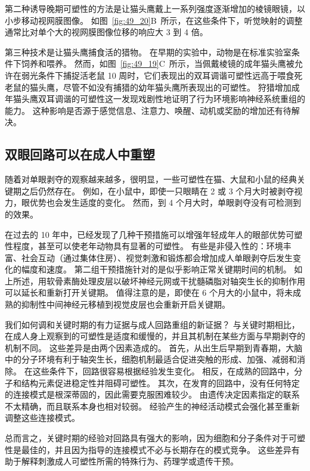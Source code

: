 第二种诱导晚期可塑性的方法是让猫头鹰戴上一系列强度逐渐增加的棱镜眼镜，以小步移动视网膜图像。
如图~\ref{fig:49_20}B~所示，在这些条件下，听觉映射的调整通常比对单个大的视网膜图像位移的响应大 3 到 4 倍。

第三种技术是让猫头鹰捕食活的猎物。
在早期的实验中，动物是在标准实验室条件下饲养和喂养。
然而，如图~\ref{fig:49_19}C~所示，当佩戴棱镜的成年猫头鹰被允许在弱光条件下捕捉活老鼠 10 周时，它们表现出的双耳调谐可塑性远高于喂食死老鼠的猫头鹰，尽管不如没有捕猎的幼年猫头鹰所表现出的可塑性。
狩猎增加成年猫头鹰双耳调谐的可塑性这一发现戏剧性地证明了行为环境影响神经系统重组的能力。
这种影响是否源于感觉信息、注意力、唤醒、动机或奖励的增加还有待解决。



\subsection{双眼回路可以在成人中重塑}

随着对单眼剥夺的观察越来越多，很明显，一些可塑性在猫、大鼠和小鼠的经典关键期之后仍然存在。
例如，在小鼠中，即使一只眼睛在 2 或 3 个月大时被剥夺视力，眼优势也会发生适度的变化。
然而，到 4 个月大时，单眼剥夺没有可检测到的效果。


在过去的 10 年中，已经发现了几种干预措施可以增强年轻成年人的眼部优势可塑性程度，甚至可以使老年动物具有显著的可塑性。
有些是非侵入性的：环境丰富、社会互动（通过集体住房）、视觉刺激和锻炼都会增加成人单眼剥夺后发生变化的幅度和速度。
第二组干预措施针对的是似乎影响正常关键期时间的机制。
如上所述，用软骨素酶处理皮层以破坏神经元网或干扰髓磷脂对轴突生长的抑制作用可以延长和重新打开关键期。
值得注意的是，即使在 6 个月大的小鼠中，将未成熟的抑制性中间神经元移植到视觉皮层也会重新开启关键期。


我们如何调和关键时期的有力证据与成人回路重组的新证据？
与关键时期相比，在成人身上观察到的可塑性是适度和缓慢的，并且其机制在某些方面与早期剥夺的机制不同。
这些差异是由两个因素造成的。
首先，从出生后早期到青春期，大脑中的分子环境有利于轴突生长，细胞机制最适合促进突触的形成、加强、减弱和消除。
在这些条件下，回路很容易根据经验发生变化。
相反，在成熟的回路中，分子和结构元素促进稳定性并阻碍可塑性。
其次，在发育的回路中，没有任何特定的连接模式是根深蒂固的，因此需要克服困难较少。
由遗传决定因素指定的联系不太精确，而且联系本身也相对较弱。
经验产生的神经活动模式会强化甚至重新调整这些连接模式。


总而言之，关键时期的经验对回路具有强大的影响，因为细胞和分子条件对于可塑性是最佳的，并且因为指导的连接模式不必与长期存在的模式竞争。
这些差异有助于解释刺激成人可塑性所需的特殊行为、药理学或遗传干预。



